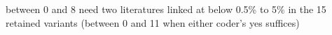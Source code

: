 between 0 and 8 need two literatures linked at below 0.5\% to 5\% in the 15 retained variants (between 0 and 11 when either coder's yes suffices)